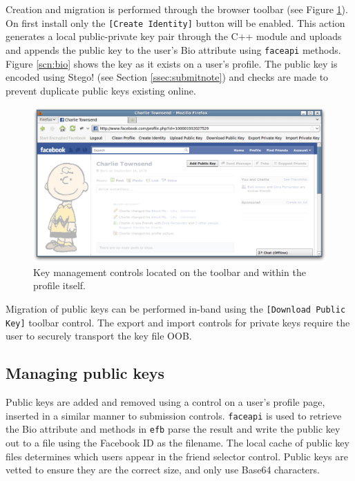 Creation and migration is performed through the browser toolbar (see Figure \ref{scn:pubkey}). On first install only the {\tt [Create Identity]} button will be enabled. This action generates a local public-private key pair through the C++ module and uploads and appends the public key to the user's Bio attribute using {\tt faceapi} methods. Figure \ref{scn:bio} shows the key as it exists on a user's profile. The public key is encoded using Stego! (see Section \ref{ssec:submitnote}) and checks are made to prevent duplicate public keys existing online.

    \begin{figure}[tbph]
        \begin{center}
        
                \includegraphics[width=12cm]{screens/pubkey.png}

            \caption{Key management controls located on the toolbar and within the profile itself.}
            \label{scn:pubkey}
        \end{center}
    \end{figure}

Migration of public keys can be performed in-band using the {\tt [Download Public Key]} toolbar control. The export and import controls for private keys require the user to securely transport the key file OOB.

    
\subsection{Managing public keys}
\label{ssec:mankeys}

Public keys are added and removed using a control on a user's profile page, inserted in a similar manner to submission controls. {\tt faceapi} is used to retrieve the Bio attribute and methods in {\tt efb} parse the result and write the public key out to a file using the Facebook ID as the filename. The local cache of public key files determines which users appear in the friend selector control. Public keys are vetted to ensure they are the correct size, and only use Base64 characters.
    
